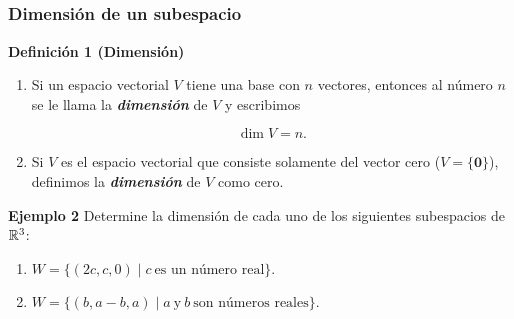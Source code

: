 \subsection{}

{\nologo
\begin{frame}\frametitle{Dimensión de un subespacio}

\begin{block}{\textbf{Definición 1 (Dimensión)}}
	\justifying
	\begin{enumerate}
		\item[\labelname{$a$}] Si un espacio vectorial $V$ tiene una base con $n$ vectores, entonces al número $n$ se le llama la
		\textbf{\textit{dimensión}} de $V$ y escribimos
		
		\vspace{-2mm}
		\[
		\dim V = n.
		\]
		
		\vspace{-1mm}
		\item[\labelname{$b$}] Si $V$ es el espacio vectorial que consiste solamente del vector cero ($V=\{\mathbf{0}\}$), definimos
		la \textbf{\textit{dimensión}} de $V$ como cero.
	\end{enumerate}		
\end{block}


\begin{ej}{\textbf{Ejemplo 2 }} \justifying
	Determine la dimensión de cada uno de los siguientes subespacios de $\mathbb{R}^3$:

	\begin{enumerate}
		\item[\labelname{$a$}]  $W = \big\{(2c,c,0)\mid c \ \text{es un número real} \big\}$.
		
		\vspace{1mm}
		\item[\labelname{$b$}] $W = \big\{(b,a-b,a)\mid a \ \text{y} \ b \ \text{son números reales} \big\}$.
	\end{enumerate}
\end{ej}	

\end{frame}
}


\subsection{}

